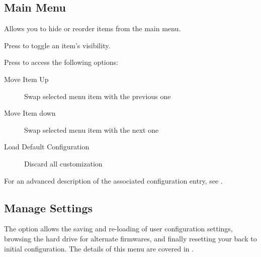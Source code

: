 

\subsection{Main Menu}
{\label{ref:main_menu_config}}
Allows you to hide or reorder items from the main menu.

Press \ActionStdOk{} to toggle an item's visibility.

Press \ActionStdContext{} to access the following options:
\begin{description}
\item[Move Item Up] Swap selected menu item with the previous one
\item[Move Item down] Swap selected menu item with the next one
\item[Load Default Configuration] Discard all customization
\end{description}

For an advanced description of the associated configuration entry,
see .

\subsection{Manage Settings}
The  option allows the saving and re-loading of user 
configuration settings, browsing the hard drive for alternate firmwares, and finally
resetting your \dap{} back to initial configuration.
%
The details of this menu are covered in
.


